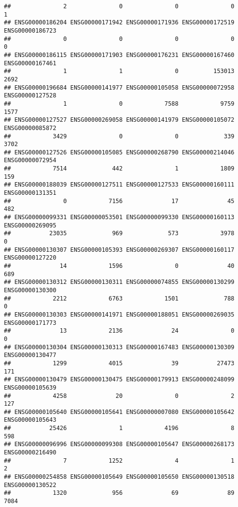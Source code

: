 \documentclass[
]{article}
\begin{document}
\begin{verbatim}
##               2               0               0               0               1 
## ENSG00000186204 ENSG00000171942 ENSG00000171936 ENSG00000172519 ENSG00000186723 
##               0               0               0               0               0 
## ENSG00000186115 ENSG00000171903 ENSG00000176231 ENSG00000167460 ENSG00000167461 
##               1               1               0          153013            2692 
## ENSG00000196684 ENSG00000141977 ENSG00000105058 ENSG00000072958 ENSG00000127528 
##               1               0            7588            9759            1577 
## ENSG00000127527 ENSG00000269058 ENSG00000141979 ENSG00000105072 ENSG00000085872 
##            3429               0               0             339            3702 
## ENSG00000127526 ENSG00000105085 ENSG00000268790 ENSG00000214046 ENSG00000072954 
##            7514             442               1            1809             159 
## ENSG00000188039 ENSG00000127511 ENSG00000127533 ENSG00000160111 ENSG00000131351 
##               0            7156              17              45             482 
## ENSG00000099331 ENSG00000053501 ENSG00000099330 ENSG00000160113 ENSG00000269095 
##           23035             969             573            3978               0 
## ENSG00000130307 ENSG00000105393 ENSG00000269307 ENSG00000160117 ENSG00000127220 
##              14            1596               0              40             689 
## ENSG00000130312 ENSG00000130311 ENSG00000074855 ENSG00000130299 ENSG00000130300 
##            2212            6763            1501             788               0 
## ENSG00000130303 ENSG00000141971 ENSG00000188051 ENSG00000269035 ENSG00000171773 
##              13            2136              24               0               0 
## ENSG00000130304 ENSG00000130313 ENSG00000167483 ENSG00000130309 ENSG00000130477 
##            1299            4015              39           27473             171 
## ENSG00000130479 ENSG00000130475 ENSG00000179913 ENSG00000248099 ENSG00000105639 
##            4258              20               0               2             127 
## ENSG00000105640 ENSG00000105641 ENSG00000007080 ENSG00000105642 ENSG00000105643 
##           25426               1            4196               8             598 
## ENSG00000096996 ENSG00000099308 ENSG00000105647 ENSG00000268173 ENSG00000216490 
##               7            1252               4               1               2 
## ENSG00000254858 ENSG00000105649 ENSG00000105650 ENSG00000130518 ENSG00000130522 
##            1320             956              69              89            7084 

\end{verbatim}
\end{document}
